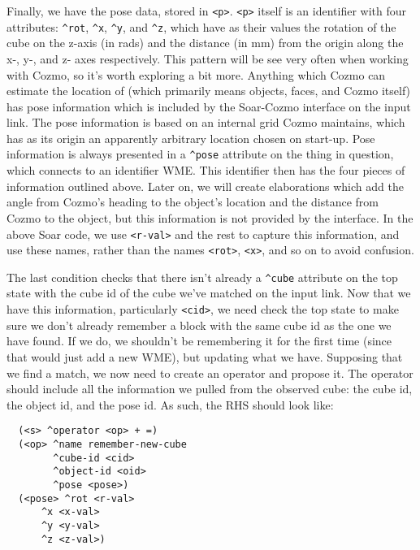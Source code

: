 Finally, we have the pose data, stored in
\texttt{\textless{}p\textgreater{}}. \texttt{\textless{}p\textgreater{}}
itself is an identifier with four attributes: \texttt{\^{}rot},
\texttt{\^{}x}, \texttt{\^{}y}, and \texttt{\^{}z}, which have as their
values the rotation of the cube on the z-axis (in rads) and the distance
(in mm) from the origin along the x-, y-, and z- axes respectively. This
pattern will be see very often when working with Cozmo, so it's worth
exploring a bit more. Anything which Cozmo can estimate the location of
(which primarily means objects, faces, and Cozmo itself) has pose
information which is included by the Soar-Cozmo interface on the input
link. The pose information is based on an internal grid Cozmo maintains,
which has as its origin an apparently arbitrary location chosen on
start-up. Pose information is always presented in a \texttt{\^{}pose}
attribute on the thing in question, which connects to an identifier WME.
This identifier then has the four pieces of information outlined above.
Later on, we will create elaborations which add the angle from Cozmo's
heading to the object's location and the distance from Cozmo to the
object, but this information is not provided by the interface. In the
above Soar code, we use \texttt{\textless{}r-val\textgreater{}} and the
rest to capture this information, and use these names, rather than the
names \texttt{\textless{}rot\textgreater{}},
\texttt{\textless{}x\textgreater{}}, and so on to avoid confusion.

The last condition checks that there isn't already a \texttt{\^{}cube}
attribute on the top state with the cube id of the cube we've matched on
the input link. Now that we have this information, particularly
\texttt{\textless{}cid\textgreater{}}, we need check the top state to
make sure we don't already remember a block with the same cube id as the
one we have found. If we do, we shouldn't be remembering it for the
first time (since that would just add a new WME), but updating what we
have. Supposing that we find a match, we now need to create an operator
and propose it. The operator should include all the information we
pulled from the observed cube: the cube id, the object id, and the pose
id. As such, the RHS should look like:

\begin{verbatim}
  (<s> ^operator <op> + =)
  (<op> ^name remember-new-cube
        ^cube-id <cid>
        ^object-id <oid>
        ^pose <pose>)
  (<pose> ^rot <r-val>
      ^x <x-val>
      ^y <y-val>
      ^z <z-val>)
\end{verbatim}

